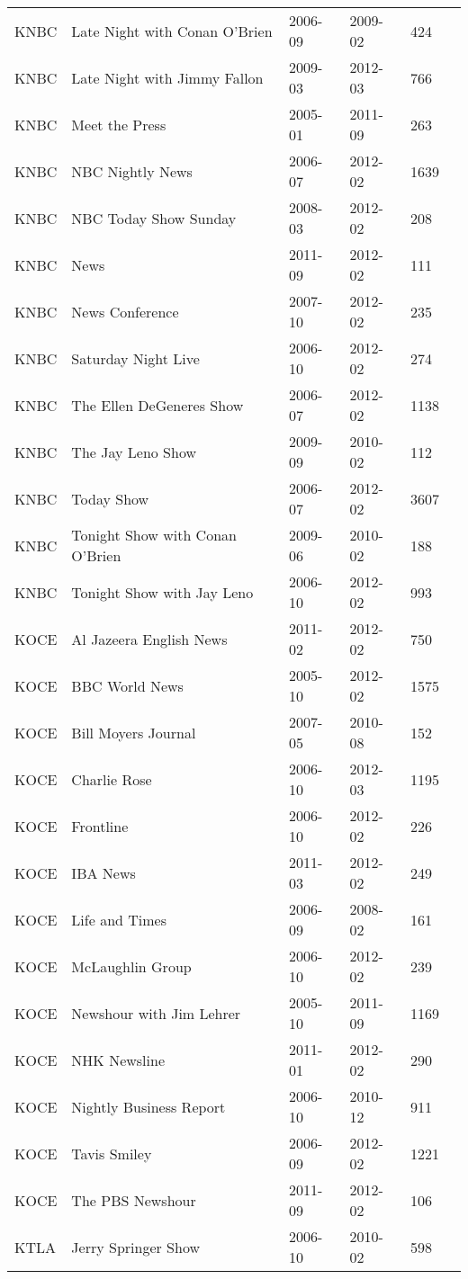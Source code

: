 \begin{longtable}{llllll}
  KNBC & Late Night with Conan O'Brien & 2006-09 & 2009-02 & 424 \\ 
  KNBC & Late Night with Jimmy Fallon & 2009-03 & 2012-03 & 766 \\ 
  KNBC & Meet the Press & 2005-01 & 2011-09 & 263 \\ 
  KNBC & NBC Nightly News & 2006-07 & 2012-02 & 1639 \\ 
  KNBC & NBC Today Show Sunday & 2008-03 & 2012-02 & 208 \\ 
  KNBC & News  & 2011-09 & 2012-02 & 111 \\ 
  KNBC & News Conference & 2007-10 & 2012-02 & 235 \\ 
  KNBC & Saturday Night Live & 2006-10 & 2012-02 & 274 \\ 
  KNBC & The Ellen DeGeneres Show & 2006-07 & 2012-02 & 1138 \\ 
  KNBC & The Jay Leno Show & 2009-09 & 2010-02 & 112 \\ 
  KNBC & Today Show & 2006-07 & 2012-02 & 3607 \\ 
  KNBC & Tonight Show with Conan O'Brien & 2009-06 & 2010-02 & 188 \\ 
  KNBC & Tonight Show with Jay Leno & 2006-10 & 2012-02 & 993 \\ 
  KOCE & Al Jazeera English News & 2011-02 & 2012-02 & 750 \\ 
  KOCE & BBC World News & 2005-10 & 2012-02 & 1575 \\ 
  KOCE & Bill Moyers Journal & 2007-05 & 2010-08 & 152 \\ 
  KOCE & Charlie Rose & 2006-10 & 2012-03 & 1195 \\ 
  KOCE & Frontline & 2006-10 & 2012-02 & 226 \\ 
  KOCE & IBA News & 2011-03 & 2012-02 & 249 \\ 
  KOCE & Life and Times & 2006-09 & 2008-02 & 161 \\ 
  KOCE & McLaughlin Group & 2006-10 & 2012-02 & 239 \\ 
  KOCE & Newshour with Jim Lehrer & 2005-10 & 2011-09 & 1169 \\ 
  KOCE & NHK Newsline & 2011-01 & 2012-02 & 290 \\ 
  KOCE & Nightly Business Report & 2006-10 & 2010-12 & 911 \\ 
  KOCE & Tavis Smiley & 2006-09 & 2012-02 & 1221 \\ 
  KOCE & The PBS Newshour & 2011-09 & 2012-02 & 106 \\ 
  KTLA & Jerry Springer Show & 2006-10 & 2010-02 & 598 \\ 

\end{longtable}
